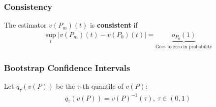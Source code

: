 \documentclass[11pt]{elegantbook}
\begin{document}
\subsubsection*{Consistency}
\begin{definition}
    \normalfont
    The estimator $v(P_m)(t)$ is \textbf{consistent} if
    \begin{equation}
        \begin{aligned}
            \sup_t|v(P_m)(t)-v(P_0)(t)|=\underbrace{o_{P_0}(1)}_\text{Goes to zero in probability}
        \end{aligned}
        \tag{*}
        \label{consistency}
    \end{equation}
\end{definition}

\subsubsection*{Bootstrap Confidence Intervals}
\begin{definition}
    \normalfont
    Let $q_\tau(v(P))$ be the $\tau$-th quantile of $v(P)$:
    \begin{equation}
        \begin{aligned}
            q_\tau(v(P))=v(P)^{-1}(\tau),\ \tau\in(0,1)
        \end{aligned}
        \nonumber
    \end{equation}
\end{definition}
\end{document}
